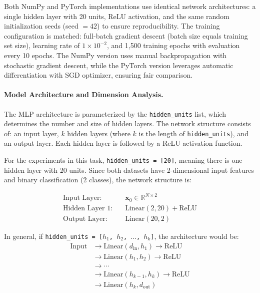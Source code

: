 \documentclass[11pt,a4paper]{article}
\begin{document}
Both NumPy and PyTorch implementations use identical network architectures: a single hidden layer with 20 units, ReLU activation, and the same random initialization seeds (seed $=42$) to ensure reproducibility. The training configuration is matched: full-batch gradient descent (batch size equals training set size), learning rate of $1 \times 10^{-2}$, and 1,500 training epochs with evaluation every 10 epochs. The NumPy version uses manual backpropagation with stochastic gradient descent, while the PyTorch version leverages automatic differentiation with SGD optimizer, ensuring fair comparison.

\paragraph{Model Architecture and Dimension Analysis.} The MLP architecture is parameterized by the \texttt{hidden\_units} list, which determines the number and size of hidden layers. The network structure consists of: an input layer, $k$ hidden layers (where $k$ is the length of \texttt{hidden\_units}), and an output layer. Each hidden layer is followed by a ReLU activation function.

For the experiments in this task, \texttt{hidden\_units = [20]}, meaning there is one hidden layer with 20 units. Since both datasets have 2-dimensional input features and binary classification (2 classes), the network structure is:

\begin{align*}
\text{Input Layer:} &\quad \mathbf{x}_0 \in \mathbb{R}^{N \times 2} \\
\text{Hidden Layer 1:} &\quad \text{Linear}(2, 20) + \text{ReLU} \\
\text{Output Layer:} &\quad \text{Linear}(20, 2)
\end{align*}

In general, if \texttt{hidden\_units = [$h_1$, $h_2$, $\ldots$, $h_k$]}, the architecture would be:
\begin{align*}
\text{Input} &\rightarrow \text{Linear}(d_{\text{in}}, h_1) \rightarrow \text{ReLU} \\
&\rightarrow \text{Linear}(h_1, h_2) \rightarrow \text{ReLU} \\
&\rightarrow \cdots \\
&\rightarrow \text{Linear}(h_{k-1}, h_k) \rightarrow \text{ReLU} \\
&\rightarrow \text{Linear}(h_k, d_{\text{out}})
\end{align*}
\end{document}
